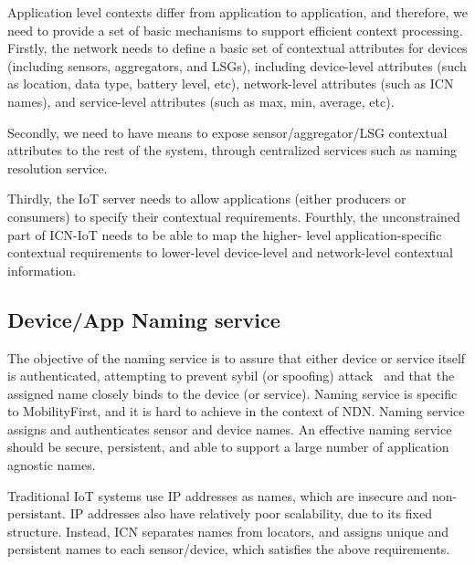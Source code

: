 Application level contexts differ from application to application,
and therefore, we need to provide a set of basic mechanisms to
support efficient context processing.  Firstly, the network needs to
define a basic set of contextual attributes for devices (including
sensors, aggregators, and LSGs), including device-level attributes
(such as location, data type, battery level, etc), network-level
attributes (such as ICN names), and service-level attributes (such as
max, min, average, etc).

Secondly, we need to have means to expose sensor/aggregator/LSG
contextual attributes to the rest of the system, through centralized
services such as naming resolution service.

Thirdly, the IoT server needs to allow applications (either producers
or consumers) to specify their contextual requirements.  Fourthly,
the unconstrained part of ICN-IoT needs to be able to map the higher-
level application-specific contextual requirements to lower-level
device-level and network-level contextual information.


\subsection{Device/App Naming service}\label{sec:naming}
The objective of the naming service is to assure that either device
or service itself is authenticated, attempting to prevent sybil (or
spoofing) attack~\cite{sybil} and that the assigned name closely binds to the
device (or service).  Naming service is specific to MobilityFirst,
and it is hard to achieve in the context of NDN.  Naming service
assigns and authenticates sensor and device names.  An effective
naming service should be secure, persistent, and able to support a
large number of application agnostic names.

Traditional IoT systems use IP addresses as names, which are insecure
and non-persistant.  IP addresses also have relatively poor
scalability, due to its fixed structure.  Instead, ICN separates
names from locators, and assigns unique and persistent names to each
sensor/device, which satisfies the above requirements.

